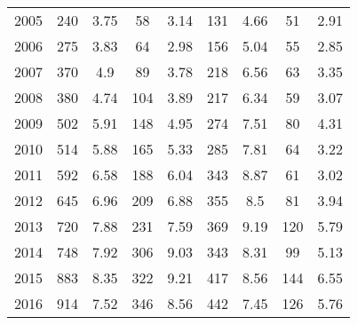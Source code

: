 \begin{table}[htbp]
\begin{tabular}{l*{8}{c}}
2005      &      240&     3.75&       58&     3.14&      131&     4.66&       51&     2.91\\
2006      &      275&     3.83&       64&     2.98&      156&     5.04&       55&     2.85\\
2007      &      370&      4.9&       89&     3.78&      218&     6.56&       63&     3.35\\
2008      &      380&     4.74&      104&     3.89&      217&     6.34&       59&     3.07\\
2009      &      502&     5.91&      148&     4.95&      274&     7.51&       80&     4.31\\
2010      &      514&     5.88&      165&     5.33&      285&     7.81&       64&     3.22\\
2011      &      592&     6.58&      188&     6.04&      343&     8.87&       61&     3.02\\
2012      &      645&     6.96&      209&     6.88&      355&      8.5&       81&     3.94\\
2013      &      720&     7.88&      231&     7.59&      369&     9.19&      120&     5.79\\
2014      &      748&     7.92&      306&     9.03&      343&     8.31&       99&     5.13\\
2015      &      883&     8.35&      322&     9.21&      417&     8.56&      144&     6.55\\
2016      &      914&     7.52&      346&     8.56&      442&     7.45&      126&     5.76\\
\hline\hline
\end{tabular}
\end{table}
